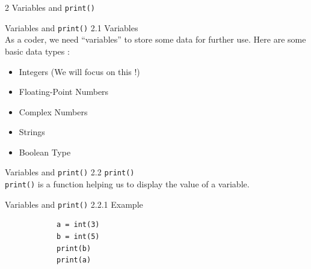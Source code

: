 \documentclass{beamer}
\begin{document}
    \begin{frame}[plain,c]
        \begin{center}
            {\color{blue} \LARGE 2 Variables and \texttt{print()}}
        \end{center}
        
    \end{frame}
    
    \begin{frame}{Variables and \texttt{print()}}
        \color{blue} \Large 2.1 Variables \\
        
        \color{black} \normalsize \vskip 10pt 
        As a coder, we need ``variables'' to store some data for further use. 
        Here are some basic data types :
        \begin{itemize}
            \item Integers (We will focus on this !)
            \item Floating-Point Numbers
            \item Complex Numbers
            \item Strings
            \item Boolean Type
        \end{itemize}
        
    \end{frame}
    
    \begin{frame}{Variables and \texttt{print()}}
        \color{blue} \Large 2.2 \texttt{print()} \\
        \color{black} \normalsize \vskip 10pt \texttt{print()} is a function helping us to display the value of a variable.
        
    \end{frame}
    
    \begin{frame}[fragile]{Variables and \texttt{print()}}
        \color{blue} \Large 2.2.1 Example \\
        \color{black} \normalsize \vskip 10pt
        \begin{verbatim}
            a = int(3)
            b = int(5)
            print(b)
            print(a)
        \end{verbatim}

    \end{frame}
        
\end{document}
